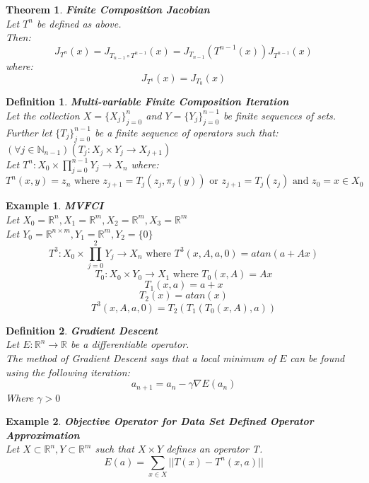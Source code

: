 \documentclass[12pt]{extarticle}
\theoremstyle{plain}
\newtheorem{thm}{Theorem}[section]
\theoremstyle{Definition}
\newtheorem{def.}{Definition}[section]
\theoremstyle{Definition}
\theoremstyle{plain}
\newtheorem{exmp}{Example}[section]
\begin{document}
\begin{thm} \textbf{Finite Composition Jacobian} \\ 
		Let $T^n$ be defined as above. \\ 
		Then: 
		$$J_{T^n}(x) = J_{T_{n-1} \circ T^{n-1}}(x) = J_{T_{n-1}}(T^{n-1}(x))J_{T^{n-1}}(x) $$
		where: 
		$$J_{T^1}(x) = J_{T_0}(x)$$	
\end{thm}

\begin{def.} \textbf{Multi-variable Finite Composition Iteration} \\ 
	Let the collection $X = \{X_j\}_{j=0}^n$ and $Y = \{Y_j\}_{j=0}^{n-1}$ be finite sequences of sets. \\ 
	Further let $\{T_j\}_{j=0}^{n-1}$ be a finite sequence of operators such that: $(\forall j \in \mathbb{N}_{n-1})(T_j : X_j \times Y_j \to X_{j+1})$ \\
	Let $T^n : X_0 \times \prod_{j=0}^{n-1}Y_j \to X_n$ where: \\ 
	$$T^n (x,y) = z_n \text{ where } z_{j+1} = T_j( z_{j},\pi_j (y) ) \text{ or } z_{j+1} = T_j( z_{j} )  \text{ and } z_0 = x \in X_0$$
\end{def.}

\begin{exmp} \textbf{MVFCI} \\ 
		Let $X_0 = \mathbb{R}^n, X_1 = \mathbb{R}^m, X_2 = \mathbb{R}^m, X_3 = \mathbb{R}^m$ \\
		Let $Y_0 = \mathbb{R}^{n\times m}, Y_1 = \mathbb{R}^m, Y_2 = \{0\}$
		$$T^3 : X_0 \times \prod_{j=0}^{2} Y_j \to X_n  \text{ where } T^3(x,A,a,0) = atan(a + Ax)$$ 
		$$T_0 : X_0 \times Y_0 \to X_1 \text{ where } T_0(x,A) = Ax$$ 
		$$T_1(x,a) = a+x$$ 
		$$T_2(x) = atan(x)$$ 
		$$T^3(x,A,a,0) = T_2(T_1(T_0(x,A),a) )$$ 
\end{exmp}

\begin{def.} \textbf{Gradient Descent} \\ 
Let $E : \mathbb{R}^n \to \mathbb{R}$ be a differentiable operator. \\ 
The method of Gradient Descent says that a local minimum of $E$ can be found using the following iteration: \\ 
$$a_{n+1} = a_n - \gamma \nabla E(a_n)$$
Where $\gamma > 0$ \\ 
\end{def.}

\begin{exmp} \textbf{Objective Operator for Data Set Defined Operator Approximation} \\ 		
Let $X \subset \mathbb{R}^n, Y \subset \mathbb{R}^m$ such that $X\times Y$ defines an operator T. \\ 
$$E(a) = \sum_{x \in X} ||T(x) - T^n(x,a)||$$ 
		
\end{exmp}
\end{document}
